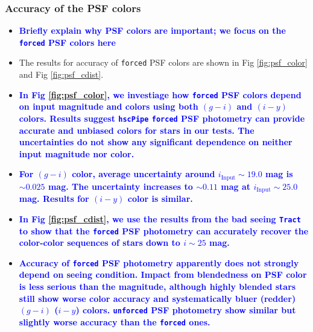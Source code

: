 \documentclass[useamsfonts]{pasj01}
\def\hscpipe{\texttt{hscPipe}}
\def\forced{\texttt{forced}}
\def\unforced{\texttt{unforced}}
\def\tract{\texttt{Tract}}
\newcommand{\plan}[1]{\textcolor{blue} {\textbf{#1}}}
\begin{document}
\subsubsection{Accuracy of the PSF colors}
    
    \begin{itemize}
    
        \item \plan{Briefly explain why PSF colors are important; we focus on the 
            \forced{} PSF colors here}
            
        \item The results for accuracy of \forced{} PSF colors are shown in 
            Fig \ref{fig:psf_color} and Fig \ref{fig:psf_cdist}.
        
        \item \plan{In Fig \ref{fig:psf_color}, we investiage how \forced{}
            PSF colors depend on input magnitude and colors using both $(g-i)$ and 
            $(i-y)$ colors. 
            Results suggest \hscpipe{} \forced{} PSF photometry can provide 
            accurate and unbiased colors for stars in our tests.
            The uncertainties do not show any significant dependence on neither input
            magnitude nor color.} 
       
        \item \plan{For $(g-i)$ color, average uncertainty around 
            $i_{\mathrm{Input}}{\sim}19.0$ mag is ${\sim}0.025$ mag. 
            The uncertainty increases to ${\sim}0.11$ mag at
            $i_{\mathrm{Input}}{\sim}25.0$ mag. 
            Results for $(i-y)$ color is similar.}
            
        \item \plan{In Fig \ref{fig:psf_cdist}, we use the results from the bad 
            seeing \tract{} to show that the \forced{} PSF photometry 
            can accurately recover the color-color sequences of stars down to 
            $i{\sim}25$ mag.}
            
        \item \plan{Accuracy of \forced{} PSF photometry apparently does not 
            strongly depend on seeing condition. 
            Impact from blendedness on PSF color is less serious than the magnitude, 
            although highly blended stars still show worse color accuracy and 
            systematically bluer (redder) $(g-i)$ ($i-y$) colors. 
            \unforced{} PSF photometry show similar but slightly worse 
            accuracy than the \forced{} ones. }
                 
    \end{itemize}
\end{document}
